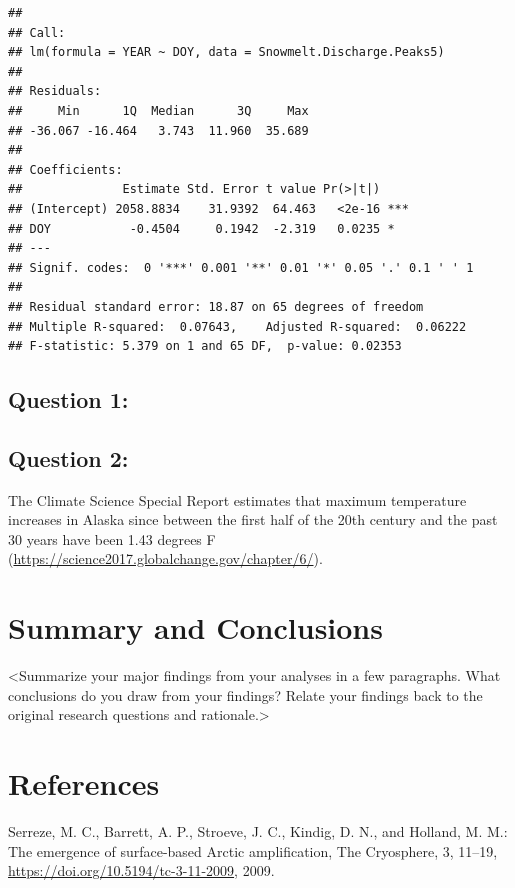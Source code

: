 \documentclass[12pt,]{article}
\begin{document}
\begin{verbatim}
## 
## Call:
## lm(formula = YEAR ~ DOY, data = Snowmelt.Discharge.Peaks5)
## 
## Residuals:
##     Min      1Q  Median      3Q     Max 
## -36.067 -16.464   3.743  11.960  35.689 
## 
## Coefficients:
##              Estimate Std. Error t value Pr(>|t|)    
## (Intercept) 2058.8834    31.9392  64.463   <2e-16 ***
## DOY           -0.4504     0.1942  -2.319   0.0235 *  
## ---
## Signif. codes:  0 '***' 0.001 '**' 0.01 '*' 0.05 '.' 0.1 ' ' 1
## 
## Residual standard error: 18.87 on 65 degrees of freedom
## Multiple R-squared:  0.07643,    Adjusted R-squared:  0.06222 
## F-statistic: 5.379 on 1 and 65 DF,  p-value: 0.02353
\end{verbatim}

\hypertarget{question-1}{%
\subsection{Question 1: }\label{question-1}}

\hypertarget{question-2}{%
\subsection{Question 2:}\label{question-2}}

The Climate Science Special Report estimates that maximum temperature
increases in Alaska since between the first half of the 20th century and
the past 30 years have been 1.43 degrees F
(\url{https://science2017.globalchange.gov/chapter/6/}).

\newpage

\hypertarget{summary-and-conclusions}{%
\section{Summary and Conclusions}\label{summary-and-conclusions}}

\textless{}Summarize your major findings from your analyses in a few
paragraphs. What conclusions do you draw from your findings? Relate your
findings back to the original research questions and
rationale.\textgreater{}

\newpage

\hypertarget{references}{%
\section{References}\label{references}}

Serreze, M. C., Barrett, A. P., Stroeve, J. C., Kindig, D. N., and
Holland, M. M.: The emergence of surface-based Arctic amplification, The
Cryosphere, 3, 11--19, \url{https://doi.org/10.5194/tc-3-11-2009}, 2009.
\end{document}
